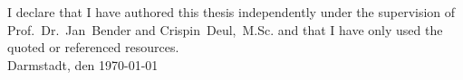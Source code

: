 \vspace*{130mm}
\begin{minipage}{129.5mm}

  I declare that I have authored this thesis independently under the
  supervision of Prof.~Dr.~Jan~Bender and Crispin~Deul,~M.Sc.
  and that I have only used the quoted or referenced resources. \\ [20mm]

Darmstadt, den \today

\end{minipage}
\renewcommand{\thepage}{\arabic{page}}
\setcounter{page}{1}
\newpage



